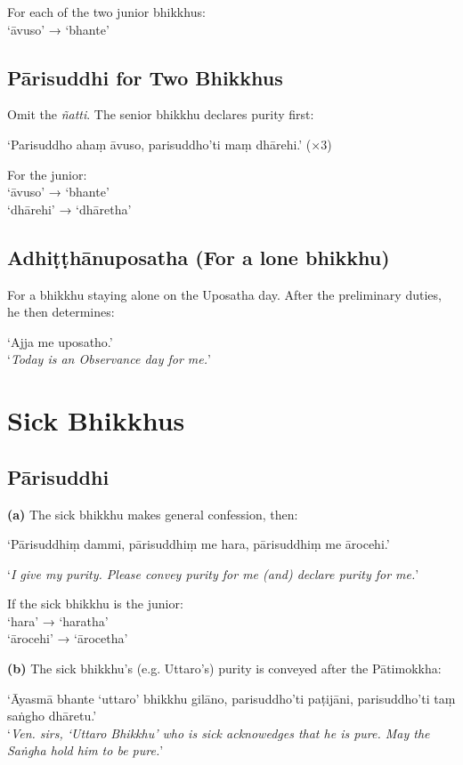 For each of the two junior bhikkhus:\\
‘āvuso’ → ‘bhante’

\subsection{Pārisuddhi for Two Bhikkhus}

Omit the \emph{ñatti}. The senior bhikkhu declares purity first:

‘Parisuddho ahaṃ āvuso, parisuddho'ti maṃ dhārehi.’ (×3)

For the junior:\\
‘āvuso’ → ‘bhante’\\
‘dhārehi’ → ‘dhāretha’

\subsection{Adhiṭṭhānuposatha (For a lone bhikkhu)}

For a bhikkhu staying alone on the Uposatha day. After the preliminary duties,
he then determines:

‘Ajja me uposatho.’\\
‘\emph{Today is an Observance day for me.}’

\section{Sick Bhikkhus}

\subsection{Pārisuddhi}

\textbf{(a)} The sick bhikkhu makes general confession, then:

‘Pārisuddhiṃ dammi, pārisuddhiṃ me hara, pārisuddhiṃ me ārocehi.’

‘\emph{I give my purity. Please convey purity for me (and) declare purity for me.}’

If the sick bhikkhu is the junior:\\
‘hara’ → ‘haratha’\\
‘ārocehi’ → ‘ārocetha’

\clearpage

\textbf{(b)} The sick bhikkhu's (e.g. Uttaro's) purity is conveyed after the
Pātimokkha:

‘Āyasmā bhante ‘uttaro’ bhikkhu gilāno, parisuddho'ti paṭijāni, parisuddho'ti taṃ saṅgho dhāretu.’\\
‘\emph{Ven. sirs, ‘Uttaro Bhikkhu’ who is sick acknowedges that he is pure. May
  the Saṅgha hold him to be pure.}’

